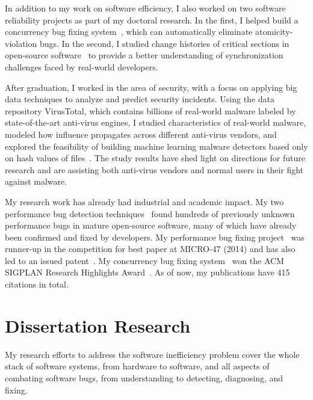 \documentclass[10pt]{article}
\begin{document}
In addition to my work on software efficiency, I also worked on two software reliability projects as part of my doctoral research. In the first, 
I helped build a concurrency bug fixing system~\cite{jin11afix}, 
which can automatically eliminate atomicity-violation bugs.
In the second, I studied change histories of critical sections in open-source software~\cite{Gu15FSE} 
to provide a better understanding of synchronization challenges faced by real-world developers. 

After graduation, I worked in the area of security, 
with a focus on applying big data techniques to analyze and predict security incidents. 
Using the data repository VirusTotal, 
which contains billions of real-world malware labeled by state-of-the-art anti-virus engines, 
I studied characteristics of real-world malware, 
modeled how influence propagates across different anti-virus vendors, 
and explored the feasibility of building machine learning malware detectors based only on hash values of files~\cite{Song16ApSys,Song17EuroSys}. 
The study results have shed light on directions for future research  
and are assisting both anti-virus vendors and normal users in their fight against malware.

My research work has already had industrial and academic impact. 
My two performance bug detection techniques~\cite{jin12perfbug, Nistor13ICSE} 
found hundreds of previously unknown performance bugs in mature open-source software, 
many of which have already been confirmed and fixed by developers. 
My performance bug fixing project~\cite{Song14MICRO} was runner-up in the competition for best paper at MICRO-47 (2014)
and has also led to an issued patent~\cite{comppatent}.
My concurrency bug fixing system~\cite{jin11afix} won the ACM SIGPLAN Research Highlights Award~\cite{afixnom}. 
As of now, my publications have 415 citations in total. 

\vspace{-.1in}
\section{Dissertation Research}

My research efforts to address the software inefficiency problem cover the whole stack of software systems, from hardware to software, 
and all aspects of combating software bugs, from understanding to detecting, diagnosing, and fixing. 

\vspace{-.1in}
\end{document}
